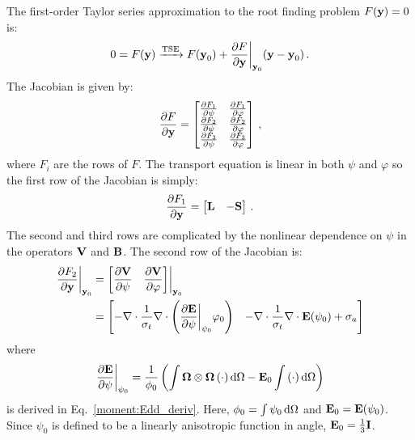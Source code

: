 \documentclass[../doc.tex]{subfiles}
\begin{document}
The first-order Taylor series approximation to the root finding problem $F(\boldsymbol{\mathrm{y}}) = 0$ is: 
	\begin{equation} \label{moment:smm_root}
		0 = F(\boldsymbol{\mathrm{y}}) \xrightarrow{\text{TSE}} F(\boldsymbol{\mathrm{y}}_0) + \frac{\partial F}{\partial \boldsymbol{\mathrm{y}}}\biggr\rvert_{\boldsymbol{\mathrm{y}}_0}(\boldsymbol{\mathrm{y}} - \boldsymbol{\mathrm{y}}_0) \,. 
	\end{equation}
The Jacobian is given by: 
	\begin{equation}
		\frac{\partial F}{\partial \boldsymbol{\mathrm{y}}} = \begin{bmatrix} 
			\frac{\partial F_1}{\partial \psi} & \frac{\partial F_1}{\partial \varphi} \\ 
			\frac{\partial F_2}{\partial \psi} & \frac{\partial F_2}{\partial \varphi} \\ 
			\frac{\partial F_3}{\partial \psi} & \frac{\partial F_3}{\partial \varphi} 
		\end{bmatrix} \,,
	\end{equation}
where $F_i$ are the rows of $F$. The transport equation is linear in both $\psi$ and $\varphi$ so the first row of the Jacobian is simply: 
	\begin{equation}
		\frac{\partial F_1}{\partial \boldsymbol{\mathrm{y}}} = \begin{bmatrix} 
			\boldsymbol{\mathrm{L}} & -\boldsymbol{\mathrm{S}} 
		\end{bmatrix} \,. 
	\end{equation}
The second and third rows are complicated by the nonlinear dependence on $\psi$ in the operators $\boldsymbol{\mathrm{V}}$ and $\boldsymbol{\mathrm{B}}$. The second row of the Jacobian is: 
	\begin{equation}
	\begin{aligned}
		\frac{\partial F_2}{\partial \boldsymbol{\mathrm{y}}}\biggr\rvert_{\boldsymbol{\mathrm{y}}_0} &= \begin{bmatrix} 
			\displaystyle\frac{\partial \boldsymbol{\mathrm{V}}}{\partial \psi} & \displaystyle\frac{\partial \boldsymbol{\mathrm{V}}}{\partial \varphi} 
		\end{bmatrix} \biggr\rvert_{\boldsymbol{\mathrm{y}}_0} \\
		&= \begin{bmatrix} 
			\displaystyle-\nabla\cdot\frac{1}{\sigma_t}\nabla\cdot\left( \frac{\partial \boldsymbol{\mathrm{E}}}{\partial \psi}\biggr\rvert_{\psi_0}\varphi_0 \right) & 
			\displaystyle-\nabla\cdot\frac{1}{\sigma_t}\nabla\cdot\boldsymbol{\mathrm{E}}(\psi_0) + \sigma_a 
		\end{bmatrix} 
	\end{aligned}
	\end{equation}
where 
	\begin{equation}
	 	\frac{\partial \boldsymbol{\mathrm{E}}}{\partial \psi}\biggr\rvert_{\psi_0} = \frac{1}{\phi_0}\left( \int \boldsymbol{\Omega}\otimes\boldsymbol{\Omega}\left( \cdot \right)\mathop{}\!\mathrm{d}\Omega - \boldsymbol{\mathrm{E}}_0\int \left( \cdot \right)\mathop{}\!\mathrm{d}\Omega \right)
	\end{equation} 
is derived in Eq.~\ref{moment:Edd_deriv}. Here, $\phi_0 = \int \psi_0 \mathop{}\!\mathrm{d} \Omega$ and $\boldsymbol{\mathrm{E}}_0 = \boldsymbol{\mathrm{E}}(\psi_0)$. Since $\psi_0$ is defined to be a linearly anisotropic function in angle, $\boldsymbol{\mathrm{E}}_0 = \frac{1}{3}\boldsymbol{\mathrm{I}}$. 
\end{document}
